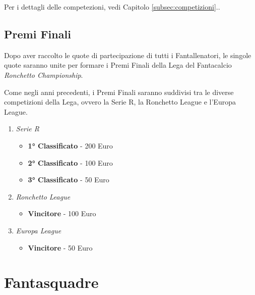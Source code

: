 \documentclass[12pt]{article}
\begin{document}
Per i dettagli delle competezioni, vedi Capitolo \ref{subsec:competizioni}..

\subsection{Premi Finali}
Dopo aver raccolto le quote di partecipazione di tutti i Fantallenatori, le singole quote saranno unite per formare i Premi Finali della Lega del Fantacalcio \textit{Ronchetto Championship}. 

Come negli anni precedenti, i Premi Finali saranno suddivisi tra le diverse competizioni della Lega, ovvero la Serie R, la Ronchetto League e l'Europa League.

\begin{enumerate}
    \item \textit{Serie R}
    \begin{itemize}
        \item \textbf{1° Classificato} - 200 Euro
        \item \textbf{2° Classificato} - 100 Euro
        \item \textbf{3° Classificato} - 50 Euro
    \end{itemize}
    \item \textit{Ronchetto League}
    \begin{itemize}
        \item \textbf{Vincitore} - 100 Euro
    \end{itemize}
    \item \textit{Europa League}
    \begin{itemize}
        \item \textbf{Vincitore} - 50 Euro
    \end{itemize}
\end{enumerate}

\newpage
\section{Fantasquadre}
\end{document}
